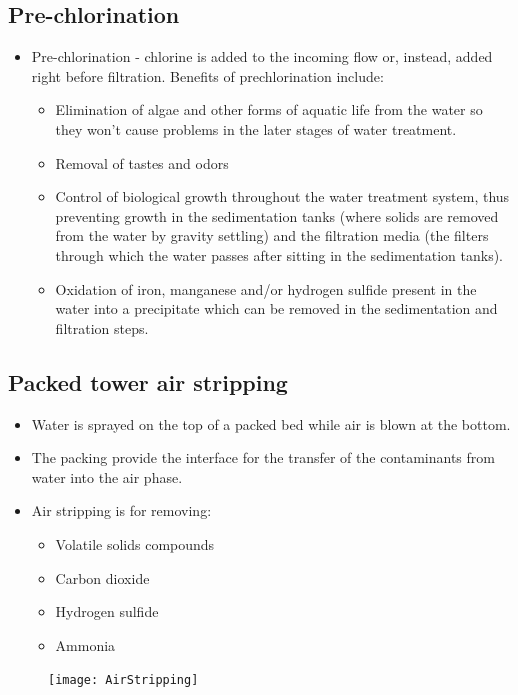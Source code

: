 \subsection{Pre-chlorination}
\begin{itemize}
\item Pre-chlorination - chlorine is added to the incoming flow or, instead, added right before filtration.  Benefits of prechlorination include:
\begin{itemize}
\item Elimination of algae and other forms of aquatic life from the water so they won’t cause problems in the later stages of water treatment. 
\item Removal of tastes and odors
\item Control of biological growth throughout the water treatment system, thus preventing growth in the sedimentation tanks (where solids are removed from the water by gravity settling) and the filtration media (the filters through which the water passes after sitting in the sedimentation tanks). 
\item Oxidation of iron, manganese and/or hydrogen sulfide present in the water into a precipitate which can be removed in the sedimentation and filtration steps.
\end{itemize}
\end{itemize}

\subsection{Packed tower air stripping}
\begin{itemize}
\item Water is sprayed on the top of a packed bed while air is blown at the bottom.
\item The packing provide the interface for the transfer of the contaminants from water into the air phase.
\item Air stripping is for removing:
\begin{itemize}
\item Volatile solids compounds
\item Carbon dioxide
\item Hydrogen sulfide
\item Ammonia
\end{itemize}
\end{itemize}
\begin{figure}[H]
\begin{center}
\texttt{[image: AirStripping]}\\
\end{center}
\end{figure}

